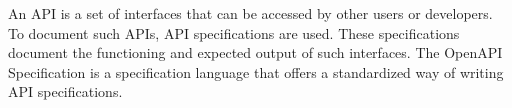 An API is a set of interfaces that can be accessed by other users or developers.
To document such APIs, API specifications are used.
These specifications document the functioning and expected output of such interfaces.
The OpenAPI Specification is a specification language that offers a standardized way of writing API specifications.